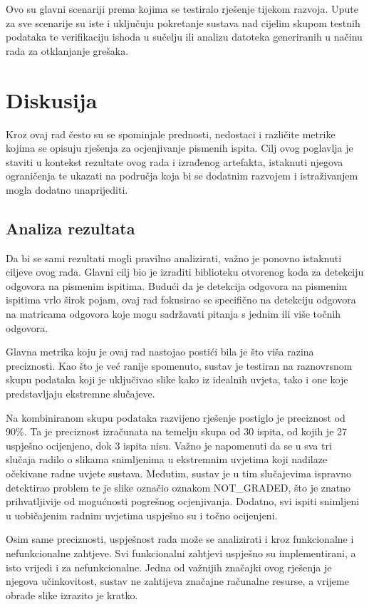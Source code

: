 \documentclass{foi}
\begin{document}
Ovo su glavni scenariji prema kojima se testiralo rješenje tijekom razvoja. Upute za sve scenarije su iste i uključuju pokretanje sustava nad cijelim skupom testnih podataka te verifikaciju ishoda u sučelju ili analizu datoteka generiranih u načinu rada za otklanjanje grešaka.

\chapter{Diskusija}

Kroz ovaj rad često su se spominjale prednosti, nedostaci i različite metrike kojima se opisuju rješenja za ocjenjivanje pismenih ispita. Cilj ovog poglavlja je staviti u kontekst rezultate ovog rada i izrađenog artefakta, istaknuti njegova ograničenja te ukazati na područja koja bi se dodatnim razvojem i istraživanjem mogla dodatno unaprijediti.
\section{Analiza rezultata}

Da bi se sami rezultati mogli pravilno analizirati, važno je ponovno istaknuti ciljeve ovog rada. Glavni cilj bio je izraditi biblioteku otvorenog koda za detekciju odgovora na pismenim ispitima. Budući da je detekcija odgovora na pismenim ispitima vrlo širok pojam, ovaj rad fokusirao se specifično na detekciju odgovora na matricama odgovora koje mogu sadržavati pitanja s jednim ili više točnih odgovora.

Glavna metrika koju je ovaj rad nastojao postići bila je što viša razina preciznosti. Kao što je već ranije spomenuto, sustav je testiran na raznovrsnom skupu podataka koji je uključivao slike kako iz idealnih uvjeta, tako i one koje predstavljaju ekstremne slučajeve.


Na kombiniranom skupu podataka razvijeno rješenje postiglo je preciznost od 90\%. Ta je preciznost izračunata na temelju skupa od 30 ispita, od kojih je 27 uspješno ocijenjeno, dok 3 ispita nisu. Važno je napomenuti da se u sva tri slučaja radilo o slikama snimljenima u ekstremnim uvjetima koji nadilaze očekivane radne uvjete sustava. Međutim, sustav je u tim slučajevima ispravno detektirao problem te je slike označio oznakom NOT\_GRADED, što je znatno prihvatljivije od mogućnosti pogrešnog ocjenjivanja. Dodatno, svi ispiti snimljeni u uobičajenim radnim uvjetima uspješno su i točno ocijenjeni.


Osim same preciznosti, uspješnost rada može se analizirati i kroz funkcionalne i nefunkcionalne zahtjeve. Svi funkcionalni zahtjevi uspješno su implementirani, a isto vrijedi i za nefunkcionalne. Jedna od važnijih značajki ovog rješenja je njegova učinkovitost, sustav ne zahtijeva značajne računalne resurse, a vrijeme obrade slike izrazito je kratko.
\end{document}
